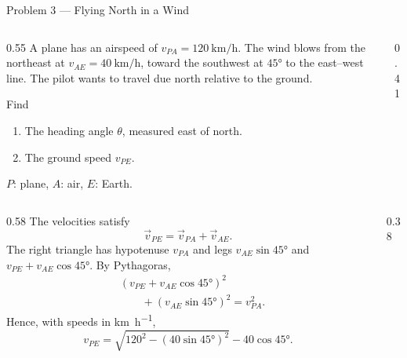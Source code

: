 \begin{frame}{Problem 3 — Flying North in a Wind}
  \begin{columns}[T,onlytextwidth]
    \begin{column}{0.55\textwidth}
      \small
      A plane has an airspeed of $v_{PA}=\SI{120}{\kilo\metre\per\hour}$.
      The wind blows from the northeast at
      $v_{AE}=\SI{40}{\kilo\metre\per\hour}$, toward the southwest
      at $\ang{45}$ to the east--west line.
      The pilot wants to travel due north relative to the ground.
      \begin{block}{Find}
        \begin{enumerate}
          \item The heading angle $\theta$, measured east of north.
          \item The ground speed $v_{PE}$.
        \end{enumerate}
      \end{block}
      \footnotesize
      $P$: plane, $A$: air, $E$: Earth.
    \end{column}
    \begin{column}{0.41\textwidth}
      \centering
      \resizebox{!}{0.48\paperheight}{}
    \end{column}
  \end{columns}
\end{frame}

\begin{solutionframe}
  \begin{columns}[T,onlytextwidth]
    \begin{column}{0.58\textwidth}
      The velocities satisfy
      \[
        \vec v_{PE}=\vec v_{PA}+\vec v_{AE}.
      \]
      The right triangle has hypotenuse $v_{PA}$ and legs
      $v_{AE}\sin\ang{45}$ and $v_{PE}+v_{AE}\cos\ang{45}$.
      By Pythagoras,
      \[
        \begin{aligned}
          &(v_{PE}+v_{AE}\cos\ang{45})^2\\
          &\qquad +(v_{AE}\sin\ang{45})^2=v_{PA}^2.
        \end{aligned}
      \]
      Hence, with speeds in \si{\kilo\metre\per\hour},
      \[
        v_{PE}=\sqrt{120^2-(40\sin\ang{45})^2}-40\cos\ang{45}.
      \]
    \end{column}
    \begin{column}{0.38\textwidth}
      \centering
      \resizebox{!}{0.46\paperheight}{}
    \end{column}
  \end{columns}
\end{solutionframe}

